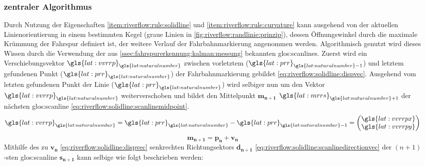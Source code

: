 \subsubsection{zentraler Algorithmus}
Durch Nutzung der Eigenschaften \ref{item:riverflow:rule:solidline} und  \ref{item:riverflow:rule:curvature} kann ausgehend von der aktuellen Linienorientierung in einem bestimmten Kegel (graue Linien in \ref{fig:riverflow:randlinie:prinzip}), dessen Öffnungswinkel durch die maximale Krümmung der Fahrspur definiert ist, der weitere Verlauf der Fahrbahnmarkierung angenommen werden.
Algorithmisch genutzt wird dieses Wissen durch die Verwendung der aus \ref{ssec:fahrspurerkennung:kalman:messung} bekannten \glspl{glos:scanline}.
Zuerst wird ein Verschiebungsvektor \(\gls{lat:vvrrp}_{\gls{lat:naturalnumber}}\) zwischen vorletztem (\(\gls{lat:prr}_{\gls{lat:naturalnumber}-1}\)) und letztem gefundenen Punkt  (\(\gls{lat:prr}_{\gls{lat:naturalnumber}}\)) der Fahrbahnmarkierung gebildet \eqref{eq:riverflow:solidline:dispvec}. Ausgehend vom letzten gefundenen Punkt der Linie (\(\gls{lat:prr}_{\gls{lat:naturalnumber}}\)) wird selbiger nun um den Vektor \(\gls{lat:vvrrp}_{\gls{lat:naturalnumber}}\) weiterverschoben und bildet den Mittelpunkt  \begin{math} \boldsymbol{m_{n+1}}  \end{math} \(\gls{lat:mrrs}_{\gls{lat:naturalnumber}+1}\) der nächsten \gls{glos:scanline} \eqref{eq:riverflow:solidline:scanlinemidpoint}.
\begin{equation}
\label{eq:riverflow:solidline:dispvec}
\gls{lat:vvrrp}_{\gls{lat:naturalnumber}} =  \gls{lat:prr}_{\gls{lat:naturalnumber}} - \gls{lat:prr}_{\gls{lat:naturalnumber}-1}
= 
\begin{pmatrix}
\gls{lat:vvrrpx} \\
\gls{lat:vvrrpy}
\end{pmatrix}
\end{equation}
\begin{equation}
\label{eq:riverflow:solidline:scanlinemidpoint}
\boldsymbol{m_{n+1}} =  \boldsymbol{p_n} + \boldsymbol{v_n}
\end{equation}
Mithilfe des zu \begin{math} \boldsymbol{v_n} \end{math} \eqref{eq:riverflow:solidline:dispvec} senkrechten Richtungsektors \begin{math} \boldsymbol{d_{n+1}} \end{math} \eqref{eq:riverflow:solidline:scanlinedirectionvec} der \begin{math} (n+1)\end{math}-sten  \gls{glos:scanline} \begin{math} \boldsymbol{s_{n+1}} \end{math} kann selbige wie folgt beschrieben werden:
